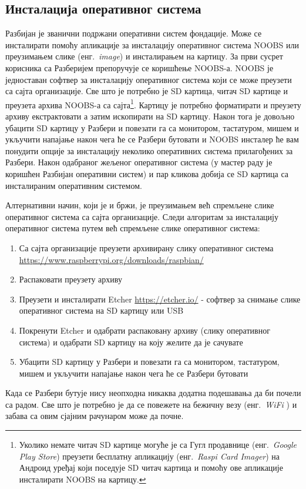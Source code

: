 \documentclass[12pt,oneside]{memoir}
\theoremstyle{remark}
\begin{document}
\subsection{Инсталација оперативног система}
Разбијан је званични подржани оперативни систем фондације. Може се инсталирати помоћу апликације за инсталацију оперативног система NOOBS или преузимањем слике (енг.~{\em image}) и инсталирањем на картицу. 
За први сусрет корисника са Разберијем препоручује се коришћење NOOBS-а. NOOBS је једноставан софтвер за инсталацију оперативног система који се може преузети са сајта организације. 
Све што је потребно је SD картица, читач SD картице и преузета архива NOOBS-а са сајта\footnote{Уколико немате читач SD картице могуће је са Гугл продавнице (енг.~{\em Google Play Store}) преузети бесплатну апликацију  (енг.~{\em Raspi Card Imager}) на Андроид уређај који поседује SD читач картица и помоћу ове апликације инсталирати NOOBS на картицу.}. Картицу је потребно форматирати и преузету архиву екстрактовати а затим ископирати на SD картицу. Након тога је довољно убацити SD картицу у Разбери и повезати га са монитором, тастатуром, мишем и укључити напајање након чега ће се Разбери бутовати и NOOBS инсталер ће вам понудити опције за инсталацију неколико оперативних система прилагођених за Разбери. Након одабраног жељеног оперативног система (у мастер раду је коришћен Разбијан оперативни систем) и пар кликова добија се SD картица са инсталираним оперативним системом. 

Алтернативни начин, који је и бржи, је преузимањем већ спремљене слике оперативног система са сајта организације. Следи алгоритам за инсталацију оперативног система путем већ спремљене слике оперативног система:
\begin{enumerate}
\item Са сајта организације преузети архивирану слику оперативног система\newline
\url{https://www.raspberrypi.org/downloads/raspbian/} 
\item  Распаковати преузету архиву
\item Преузети и инсталирати Etcher \url{https://etcher.io/} - софтвер за снимање слике оперативног система на SD картицу или USB
\item Покренути Etcher и одабрати распаковану архиву (слику оперативног система) и одабрати SD картицу на коју желите да је сачувате
\item Убацити SD картицу у Разбери и повезати га са монитором, тастатуром, мишем и укључити напајање након чега ће се Разбери бутовати
\end{enumerate}
Када се Разбери бутује нису неопходна никаква додатна подешавања да би почели са радом. Све што је потребно је да се повежете на бежичну везу (енг.~{\em WiFi }) и забава са овим сјајним рачунаром може да почне.
\end{document}

